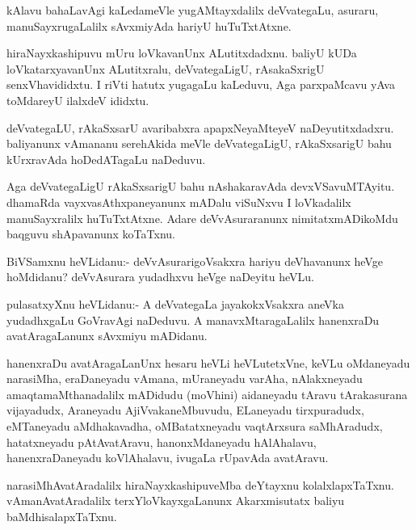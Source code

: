 \documentclass{article}
\begin{document}
\begin{mn}
kAlavu bahaLavAgi kaLedameVle yugAMtayxdalilx deVvategaLu, asuraru,
manuSayxrugaLalilx sAvxmiyAda hariyU huTuTxtAtxne.
\end{mn}

\begin{mn}%
hiraNayxkashipuvu mUru loVkavanUnx ALutitxdadxnu. baliyU kUDa
loVkatarxyavanUnx ALutitxralu, deVvategaLigU, rAsakaSxrigU
senxVhavididxtu. I riVti hatutx yugagaLu kaLeduvu, Aga parxpaMcavu
yAva toMdareyU ilalxdeV ididxtu.
\end{mn}

\begin{mn}%
deVvategaLU, rAkaSxsarU avaribabxra apapxNeyaMteyeV
naDeyutitxdadxru. baliyanunx vAmananu serehAkida meVle deVvategaLigU,
rAkaSxsarigU bahu kUrxravAda hoDedATagaLu naDeduvu.
\end{mn}

\begin{mn}
Aga deVvategaLigU rAkaSxsarigU bahu nAshakaravAda
devxVSavuMTAyitu. dhamaRda vayxvasAthxpaneyanunx mADalu viSuNxvu I
loVkadalilx manuSayxralilx huTuTxtAtxne. Adare deVvAsuraranunx
nimitatxmADikoMdu baqguvu shApavanunx koTaTxnu.
\end{mn}

\begin{mn}
BiVSamxnu heVLidanu:- deVvAsurarigoVsakxra hariyu deVhavanunx heVge
hoMdidanu? deVvAsurara yudadhxvu heVge naDeyitu heVLu.
\end{mn}

\begin{mn}
pulasatxyXnu heVLidanu:- A deVvategaLa jayakokxVsakxra aneVka
yudadhxgaLu GoVravAgi naDeduvu. A manavxMtaragaLalilx hanenxraDu
avatAragaLanunx sAvxmiyu mADidanu.
\end{mn}

\begin{mn}%
hanenxraDu avatAragaLanUnx hesaru heVLi heVLutetxVne, keVLu oMdaneyadu
narasiMha, eraDaneyadu vAmana, mUraneyadu varAha, nAlakxneyadu
amaqtamaMthanadalilx mADidudu (moVhini) aidaneyadu tAravu tArakasurana
vijayadudx, Araneyadu AjiVvakaneMbuvudu, ELaneyadu tirxpuradudx,
eMTaneyadu aMdhakavadha, oMBatatxneyadu vaqtArxsura saMhAradudx,
hatatxneyadu pAtAvatAravu, hanonxMdaneyadu hAlAhalavu,
hanenxraDaneyadu koVlAhalavu, ivugaLa rUpavAda avatAravu.
\end{mn}

\begin{mn}
narasiMhAvatAradalilx hiraNayxkashipuveMba deYtayxnu
kolalxlapxTaTxnu. vAmanAvatAradalilx terxYloVkayxgaLanunx
Akarxmisutatx baliyu baMdhisalapxTaTxnu.
\end{mn}
\end{document}
